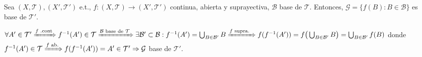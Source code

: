 \begin{ejr}[29]
  Sea $( X, \mathcal{T} ), ( X', \mathcal{T}' )$ e.t., $f: ( X, \mathcal{T} ) \to ( X', \mathcal{T}' )$ continua, abierta y suprayectiva, $\mathcal{B}$ base de $\mathcal{T}$. Entonces, $\mathcal{G} = \{ f(B) : B \in \mathcal{B} \}$ es base de $\mathcal{T}'$.
\end{ejr}

\begin{sol}
  $\forall A' \in \mathcal{T}' \xRightarrow[]{f \text{ .cont}} f^{-1}(A') \in \mathcal{T} \xRightarrow[]{ \mathcal{B} \text{ base de } \mathcal{T}} \exists \mathcal{B}' \subset \mathcal{B} : f^{-1}(A') = \bigcup_{B \in \mathcal{B}'} B \xRightarrow[]{ f \text{ supra. } }f(f^{-1}(A')) = f \big ( \bigcup_{B \in \mathcal{B}'} B \big ) = \bigcup_{B \in \mathcal{B}'} f(B)$ donde $f^{-1}(A') \in \mathcal{T} \xRightarrow[]{ f \text{ ab.} } f(f^{-1}(A')) = A' \in \mathcal{T}' \Rightarrow \mathcal{G}$ base de $\mathcal{T}'$.
\end{sol}
